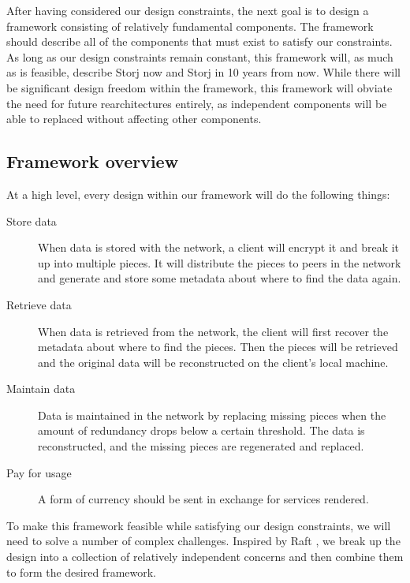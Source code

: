 \documentclass[a4paper,10pt]{article} \usepackage[utf8]{inputenc}
\begin{document}
After having considered our design constraints, the next goal is to design
a framework consisting of relatively fundamental components.
The framework should describe
all of the components that must exist to satisfy our constraints.
As long as our design constraints remain constant, this framework will, as
much as is feasible, describe Storj now and Storj in 10 years from now.
While there will be significant design freedom within the framework,
this framework will obviate the need for future rearchitectures entirely, as
independent components will be able to replaced without affecting other
components.

\subsection{Framework overview}

At a high level, every design within our framework will do the following
things:

\begin{description}

\item[Store data] When data is stored with the network, a client will encrypt
it and break it up into multiple pieces. It will distribute the pieces
to peers in the network and generate and store some metadata about where to
find the data again.

\item[Retrieve data] When data is retrieved from the network,
the client will first recover the metadata about where to find the pieces.
Then the pieces will be retrieved and the original data will be reconstructed
on the client's local machine.

\item[Maintain data] Data is maintained in the network by replacing
missing pieces when the amount of redundancy drops below a certain threshold.
The data is reconstructed, and the missing pieces are regenerated and replaced.

\item[Pay for usage] A form of currency should be sent in exchange for
services rendered.

\end{description}

To make this framework feasible while satisfying our design constraints, we
will need to solve a number of complex challenges.
Inspired by Raft \cite{raft}, we
break up the design into a collection of relatively independent concerns and
then combine them to form the desired framework.
\end{document}
